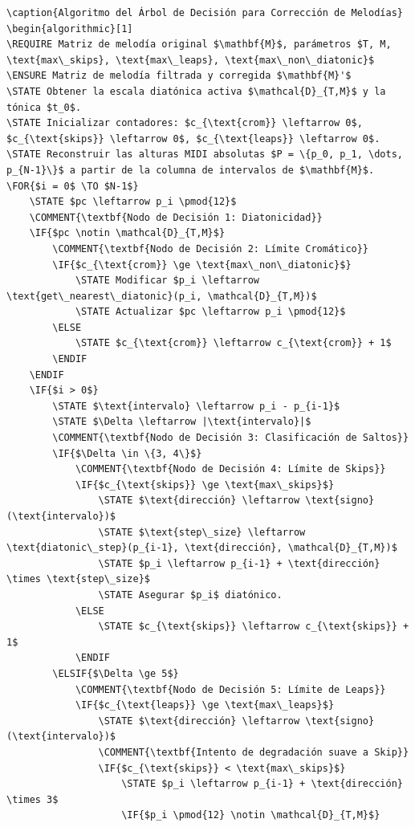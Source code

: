 \documentclass[12pt]{report}
\begin{document}
\begin{verbatim}
\caption{Algoritmo del Árbol de Decisión para Corrección de Melodías}
\begin{algorithmic}[1]
\REQUIRE Matriz de melodía original $\mathbf{M}$, parámetros $T, M, \text{max\_skips}, \text{max\_leaps}, \text{max\_non\_diatonic}$
\ENSURE Matriz de melodía filtrada y corregida $\mathbf{M}'$
\STATE Obtener la escala diatónica activa $\mathcal{D}_{T,M}$ y la tónica $t_0$.
\STATE Inicializar contadores: $c_{\text{crom}} \leftarrow 0$, $c_{\text{skips}} \leftarrow 0$, $c_{\text{leaps}} \leftarrow 0$.
\STATE Reconstruir las alturas MIDI absolutas $P = \{p_0, p_1, \dots, p_{N-1}\}$ a partir de la columna de intervalos de $\mathbf{M}$.
\FOR{$i = 0$ \TO $N-1$}
    \STATE $pc \leftarrow p_i \pmod{12}$
    \COMMENT{\textbf{Nodo de Decisión 1: Diatonicidad}}
    \IF{$pc \notin \mathcal{D}_{T,M}$}
        \COMMENT{\textbf{Nodo de Decisión 2: Límite Cromático}}
        \IF{$c_{\text{crom}} \ge \text{max\_non\_diatonic}$}
            \STATE Modificar $p_i \leftarrow \text{get\_nearest\_diatonic}(p_i, \mathcal{D}_{T,M})$
            \STATE Actualizar $pc \leftarrow p_i \pmod{12}$
        \ELSE
            \STATE $c_{\text{crom}} \leftarrow c_{\text{crom}} + 1$
        \ENDIF
    \ENDIF
    \IF{$i > 0$}
        \STATE $\text{intervalo} \leftarrow p_i - p_{i-1}$
        \STATE $\Delta \leftarrow |\text{intervalo}|$
        \COMMENT{\textbf{Nodo de Decisión 3: Clasificación de Saltos}}
        \IF{$\Delta \in \{3, 4\}$}
            \COMMENT{\textbf{Nodo de Decisión 4: Límite de Skips}}
            \IF{$c_{\text{skips}} \ge \text{max\_skips}$}
                \STATE $\text{dirección} \leftarrow \text{signo}(\text{intervalo})$
                \STATE $\text{step\_size} \leftarrow \text{diatonic\_step}(p_{i-1}, \text{dirección}, \mathcal{D}_{T,M})$
                \STATE $p_i \leftarrow p_{i-1} + \text{dirección} \times \text{step\_size}$
                \STATE Asegurar $p_i$ diatónico.
            \ELSE
                \STATE $c_{\text{skips}} \leftarrow c_{\text{skips}} + 1$
            \ENDIF
        \ELSIF{$\Delta \ge 5$}
            \COMMENT{\textbf{Nodo de Decisión 5: Límite de Leaps}}
            \IF{$c_{\text{leaps}} \ge \text{max\_leaps}$}
                \STATE $\text{dirección} \leftarrow \text{signo}(\text{intervalo})$
                \COMMENT{\textbf{Intento de degradación suave a Skip}}
                \IF{$c_{\text{skips}} < \text{max\_skips}$}
                    \STATE $p_i \leftarrow p_{i-1} + \text{dirección} \times 3$
                    \IF{$p_i \pmod{12} \notin \mathcal{D}_{T,M}$}

\end{verbatim}
\end{document}
